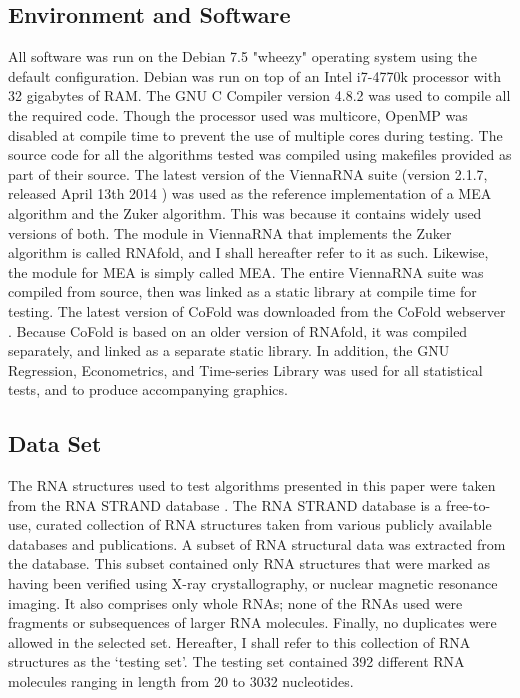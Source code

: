 \documentclass[12pt, a4paper]{article}
\begin{document}
\subsection{Environment and Software}
All software was run on the Debian 7.5 "wheezy" operating system using the default configuration. Debian was run on top of an Intel i7-4770k processor with 32 gigabytes of RAM. The GNU C Compiler version 4.8.2 was used to compile all the required code. Though the processor used was multicore, OpenMP was disabled at compile time to prevent the use of multiple cores during testing. The source code for all the algorithms tested was compiled using makefiles provided as part of their source. The latest version of the ViennaRNA suite \cite{lorenz2011viennarna} (version 2.1.7, released April 13th 2014 \cite{lorenz2014online}) was used as the reference implementation of a MEA algorithm and the Zuker algorithm. This was because it contains widely used versions of both. The module in ViennaRNA that implements the Zuker algorithm is called RNAfold, and I shall hereafter refer to it as such. Likewise, the module for MEA is simply called MEA. The entire ViennaRNA suite was compiled from source, then was linked as a static library at compile time for testing. The latest version of CoFold was downloaded from the CoFold webserver \cite{cofold2014online}. Because CoFold is based on an older version of RNAfold, it was compiled separately, and linked as a separate static library. In addition, the GNU Regression, Econometrics, and Time-series Library \cite{baiocchi2003gretl} was used for all statistical tests, and to produce accompanying graphics.

\subsection{Data Set}
The RNA structures used to test algorithms presented in this paper were taken from the RNA STRAND database \cite{andronescu2008rna}. The RNA STRAND database is a free-to-use, curated collection of RNA structures taken from various publicly available databases and publications. A subset of RNA structural data was extracted from the database. This subset contained only RNA structures that were marked as having been verified using X-ray crystallography, or nuclear magnetic resonance imaging. It also comprises only whole RNAs; none of the RNAs used were fragments or subsequences of larger RNA molecules. Finally, no duplicates were allowed in the selected set. Hereafter, I shall refer to this collection of RNA structures as the `testing set'. The testing set contained 392 different RNA molecules ranging in length from 20 to 3032 nucleotides.
\end{document}
